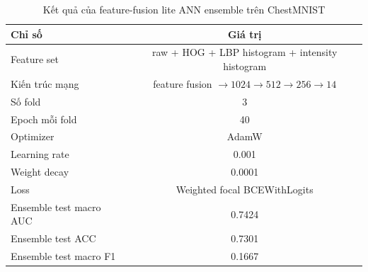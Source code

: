 \begin{table}[H]
\centering
\caption{Kết quả của feature-fusion lite ANN ensemble trên ChestMNIST}
\label{tab:chestmnist-lite-results}
\begin{tabular}{l c}
\toprule
Chỉ số & Giá trị \\
\midrule
Feature set & raw + HOG + LBP histogram + intensity histogram \\
Kiến trúc mạng & feature fusion $\rightarrow 1024 \rightarrow 512 \rightarrow 256 \rightarrow 14$ \\
Số fold & 3 \\
Epoch mỗi fold & 40 \\
Optimizer & AdamW \\
Learning rate & 0.001 \\
Weight decay & 0.0001 \\
Loss & Weighted focal BCEWithLogits \\
Ensemble test macro AUC & 0.7424 \\
Ensemble test ACC & 0.7301 \\
Ensemble test macro F1 & 0.1667 \\
\bottomrule
\end{tabular}
\end{table}
